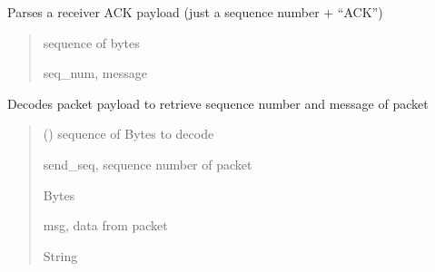 \documentclass[letterpaper,10pt,oneside,english,openany]{sphinxmanual}
\begin{document}

\begin{fulllineitems}
\label{\detokenize{modules:sender_rdt.convert_ack_payload}}
\pysigstartsignatures
\pysiglinewithargsret
{}
{}
{}
\pysigstopsignatures
\sphinxAtStartPar
Parses a receiver ACK payload (just a sequence number + “ACK”)
\begin{quote}\begin{description}
\sphinxAtStartPar
{} \textendash{} sequence of bytes

\sphinxAtStartPar
seq\_num, message

\end{description}\end{quote}

\end{fulllineitems}


\begin{fulllineitems}
\label{\detokenize{modules:sender_rdt.convert_receiver_payload}}
\pysigstartsignatures
\pysiglinewithargsret
{}
{}
{}
\pysigstopsignatures
\sphinxAtStartPar
Decodes packet payload to retrieve sequence number and message of packet
\begin{quote}\begin{description}
\sphinxAtStartPar
{} () \textendash{} sequence of Bytes to decode

\sphinxAtStartPar
send\_seq, sequence number of packet

\sphinxAtStartPar
Bytes

\sphinxAtStartPar
msg, data from packet

\sphinxAtStartPar
String

\end{description}\end{quote}

\end{fulllineitems}
\end{document}
